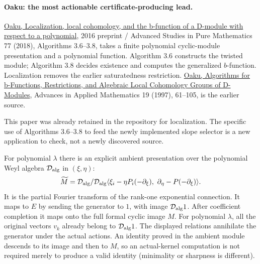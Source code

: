 \documentclass[11pt]{article}
\begin{document}
\paragraph{Oaku: the most actionable certificate-producing lead.}
\href{https://arxiv.org/abs/1609.04676}{Oaku, Localization, local cohomology, and the b-function of a D-module with respect to a polynomial}, 2016 preprint / Advanced Studies in Pure Mathematics 77 (2018), Algorithms 3.6--3.8, takes a finite polynomial cyclic-module presentation and a polynomial function. Algorithm 3.6 constructs the twisted module; Algorithm 3.8 decides existence and computes the generalized $b$-function. Localization removes the earlier saturatedness restriction. \href{https://www.lab.twcu.ac.jp/oaku/aam1997.pdf}{Oaku, Algorithms for b-Functions, Restrictions, and Algebraic Local Cohomology Groups of D-Modules}, Advances in Applied Mathematics 19 (1997), 61--105, is the earlier source.

This paper was already retained in the repository for localization. The specific use of Algorithms 3.6--3.8 to feed the newly implemented slope selector is a new application to check, not a newly discovered source.

For polynomial $\lambda$ there is an explicit ambient presentation over the polynomial Weyl algebra $\mathcal D_{\rm alg}$ in $(\xi,\eta)$:
\[
 \widetilde M=\mathcal D_{\rm alg}/
 \mathcal D_{\rm alg}\langle
  \xi_i-\eta P_i(-\partial_\xi),\ 
  \partial_\eta-P(-\partial_\xi)\rangle.
\]
It is the partial Fourier transform of the rank-one exponential connection. It maps to $E$ by sending the generator to $1$, with image $\mathcal D_{\rm alg}1$. After coefficient completion it maps onto the full formal cyclic image $M$. For polynomial $\lambda$, all the original vectors $v_k$ already belong to $\mathcal D_{\rm alg}1$. The displayed relations annihilate the generator under the actual actions. An identity proved in the ambient module descends to its image and then to $M$, so an actual-kernel computation is not required merely to produce a valid identity (minimality or sharpness is different).
\end{document}
